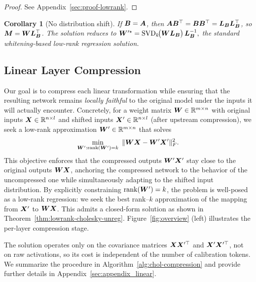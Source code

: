 \documentclass[10pt]{article} %
\newtheorem{corollary}[theorem]{Corollary}
\theoremstyle{definition}
\theoremstyle{remark}
\newcommand{\ourmethodlight}{{\textsc{AA-SVD}}}
\begin{document}
\begin{proof}
See Appendix~\ref{sec:proof-lowrank}.
\end{proof}

\begin{corollary}[No distribution shift]
\label{cor:no-shift}
If ${\bm{B}} = {\bm{A}}$, then ${\bm{A}}{\bm{B}}^\top = {\bm{B}}{\bm{B}}^\top = {\bm{L}}_{\bm{B}}{\bm{L}}_{\bm{B}}^\top$, so ${\bm{M}} = {\bm{W}}{\bm{L}}_{\bm{B}}^\top$.
The solution reduces to
$
{\bm{W}}'^{\star} = \operatorname{SVD}_k\!\bigl({\bm{W}}{\bm{L}}_{\bm{B}}\bigr)\,{\bm{L}}_{\bm{B}}^{-1},
$
the standard whitening-based low-rank regression solution.
\end{corollary}
% 

\subsection{Linear Layer Compression}

Our goal is to compress each linear transformation while ensuring that the resulting network remains \emph{locally faithful} to the original model under the inputs it will actually encounter.
Concretely, for a weight matrix ${\bm{W}} \in \mathbb{R}^{m \times n}$ with original inputs ${\bm{X}} \in \mathbb{R}^{n \times l}$ and shifted inputs ${\bm{X}}' \in \mathbb{R}^{n \times l}$ (after upstream compression), we seek a low-rank approximation ${\bm{W}}' \in \mathbb{R}^{m \times n}$ that solves
\[
\min_{{\bm{W}}' : \mathrm{rank}({\bm{W}}') = k} \ \| {\bm{W}} {\bm{X}} - {\bm{W}}' {\bm{X}}' \|_F^2.
\]
% 
This objective enforces that the compressed outputs ${\bm{W}}'{\bm{X}}'$ stay close to the original outputs ${\bm{W}}{\bm{X}}$, anchoring the compressed network to the behavior of the uncompressed one while simultaneously adapting to the shifted input distribution.
By explicitly constraining $\mathrm{rank}({\bm{W}}')=k$, the problem is well-posed as a low-rank regression: we seek the best rank–$k$ approximation of the mapping from ${\bm{X}}'$ to ${\bm{W}}{\bm{X}}$.
This admits a closed-form solution as shown in Theorem~\ref{thm:lowrank-cholesky-unreg}. Figure~\ref{fig:overview} (left) illustrates the per-layer compression stage.

The solution operates only on the covariance matrices ${\bm{X}}{\bm{X}}'^{\top}$ and ${\bm{X}}'{\bm{X}}'^{\top}$, not on raw activations, so its cost is independent of the number of calibration tokens. We summarize the procedure in Algorithm~\ref{alg:chol-compression} and provide further details in Appendix~\ref{sec:appendix_linear}.
\end{document}
